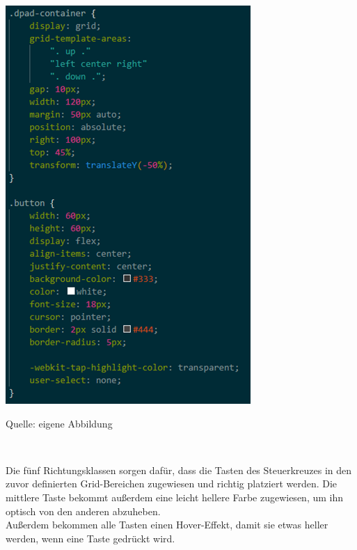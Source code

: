 \documentclass[ngerman,12pt,a4paper]{article}
\begin{document}
	\begin{center}
		\begin{minipage}[t]{0.55\textwidth}
			\includegraphics[scale=0.9]{Pictures/Steuerung-css1}
			\label{fig:Steuerkreuz-css1}
			\vspace{-10pt}
			\begin{center}
				\par\small Quelle: eigene Abbildung 
			\end{center}
		\end{minipage} \\[0.75cm]
	\end{center}
	Die fünf Richtungsklassen sorgen dafür, dass die Tasten des Steuerkreuzes in den zuvor definierten Grid-Bereichen zugewiesen und richtig platziert werden. Die mittlere Taste bekommt außerdem eine leicht hellere Farbe zugewiesen, um ihn optisch von den anderen abzuheben. \\[0.5cm]
	Außerdem bekommen alle Tasten einen Hover-Effekt, damit sie etwas heller werden, wenn eine Taste gedrückt wird. \\
\end{document}

